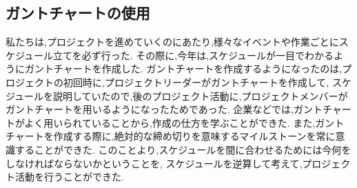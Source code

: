 \subsection{ガントチャートの使用}
\par
私たちは,プロジェクトを進めていくのにあたり,様々なイベントや作業ごとにスケジュール立てを必ず行った.
その際に,今年は,スケジュールが一目でわかるようにガントチャートを作成した.
ガントチャートを作成するようになったのは,プロジェクトの初回時に,プロジェクトリーダーがガントチャートを作成して,
スケジュールを説明していたので,後のプロジェクト活動に,プロジェクトメンバーがガントチャートを用いるようになったためであった.
企業などでは,ガントチャートがよく用いられていることから,作成の仕方を学ぶことができた.
また,ガントチャートを作成する際に,絶対的な締め切りを意味するマイルストーンを常に意識することができた.
このことより,スケジュールを間に合わせるためには今何をしなければならないかということを,
スケジュールを逆算して考えて,プロジェクト活動を行うことができた.
